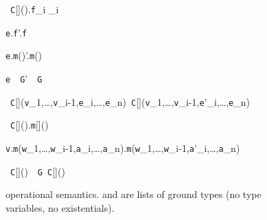 \begin{figure*}
\vspace{-\bigskipamount}
\begin{minipage}{.33\textwidth}
\quad{}
	{\new~{\tt C}[]().{\tt f}_i _i}

	{{\tt e}.{\tt f}'.{\tt f}}

	{{\tt e}.{\tt m}()'.{\tt m}()}

	{{\tt e}~\as~{\tt G}'~\as~{\tt G}}
\end{minipage}%
\begin{minipage}{.67\textwidth}
\quad{}
	{\new~{\tt C}[]({\tt v}_1,\ldots,{\tt v}_{i-1},{\tt e}_i,\ldots,{\tt e}_n)\derives\new~{\tt C}[]({\tt v}_1,\ldots,{\tt v}_{i-1},{\tt e}'_i,\ldots,{\tt e}_n)}

	{\new~{\tt C}[]().{\tt m}[]()\theta}

	{{\tt v}.{\tt m}({\tt w}_1,\ldots,{\tt w}_{i-1},{\tt a}_i,\ldots,{\tt a}_n).{\tt m}({\tt w}_1,\ldots,{\tt w}_{i-1},{\tt a}'_i,\ldots,{\tt a}_n)}

	{\new~{\tt C}[]()~\as~{\tt G}\derives\new~{\tt C}[]()}
\end{minipage}
\caption{\FXG operational semantics.  and  are lists of ground types (no type variables, no existentials).}
\label{fig:sos}
\end{figure*}


